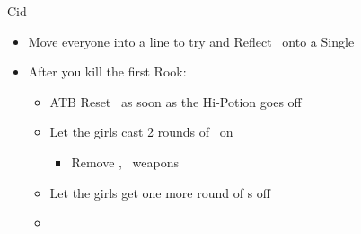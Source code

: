 \begin{battle}{Cid}
	\begin{itemize}
		\item Move everyone into a line to try and Reflect \bio\ onto a Single 
		\beliasfreeze{}
		\item After you kill the first Rook:
		\begin{itemize}
			\vaanf Hi-Potion
			\penelof \bio\  (D if C is dead)
			\ashef \bio\   (D if C is dead)
			\vaanf Traveler  (D if C is dead)
			\item ATB Reset \vaan\ as soon as the Hi-Potion goes off
			\item Let the girls cast 2 rounds of \bio\ on 
			\begin{menu}
			\begin{itemize}
				\item Remove \ashe, \penelo\ weapons
				\battleactive
			\end{itemize}
			\end{menu}
			\item Let the girls get one more round of \bio s off
			\item \GirlsGambitOff		
		\end{itemize}
	\end{itemize}
\end{battle}